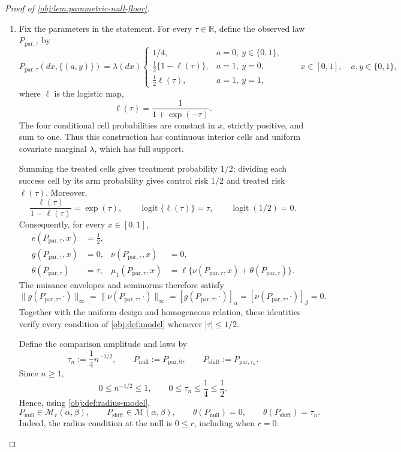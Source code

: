 \documentclass[11pt]{article}
\begin{document}
\begin{proof}[Proof of \cref{obj:lem:parametric-null-floor}]
\begin{enumerate}
\item Fix the parameters in the statement. For every \(\tau\in\mathbb R\), define the observed law \(P_{\mathrm{par},\tau}\) by
\[
P_{\mathrm{par},\tau}(dx,\{(a,y)\})
=
\lambda(dx)
\begin{cases}
1/4,&a=0,\ y\in\{0,1\},\\
\frac12\{1-\ell(\tau)\},&a=1,\ y=0,\\
\frac12\ell(\tau),&a=1,\ y=1,
\end{cases}
\qquad
x\in[0,1],\quad a,y\in\{0,1\},
\]
where \(\ell\) is the logistic map,
\[
\ell(\tau)=\frac{1}{1+\exp(-\tau)}.
\]
The four conditional cell probabilities are constant in \(x\), strictly positive, and sum to one. Thus this construction has continuous interior cells and uniform covariate marginal \(\lambda\), which has full support.

Summing the treated cells gives treatment probability \(1/2\); dividing each success cell by its arm probability gives control risk \(1/2\) and treated risk \(\ell(\tau)\). Moreover,
\[
\frac{\ell(\tau)}{1-\ell(\tau)}=\exp(\tau),
\qquad
\operatorname{logit}\{\ell(\tau)\}=\tau,
\qquad
\operatorname{logit}(1/2)=0.
\]
Consequently, for every \(x\in[0,1]\),
\[
\begin{aligned}
e(P_{\mathrm{par},\tau},x)&=\frac12,\\
g(P_{\mathrm{par},\tau},x)&=0,
&
\nu(P_{\mathrm{par},\tau},x)&=0,\\
\theta(P_{\mathrm{par},\tau})&=\tau,
&
\mu_1(P_{\mathrm{par},\tau},x)
&=\ell\{\nu(P_{\mathrm{par},\tau},x)+\theta(P_{\mathrm{par},\tau})\}.
\end{aligned}
\]
The nuisance envelopes and seminorms therefore satisfy
\[
\|g(P_{\mathrm{par},\tau},\cdot)\|_\infty
=
\|\nu(P_{\mathrm{par},\tau},\cdot)\|_\infty
=
[g(P_{\mathrm{par},\tau},\cdot)]_\alpha
=
[\nu(P_{\mathrm{par},\tau},\cdot)]_\beta
=0.
\]
Together with the uniform design and homogeneous relation, these identities verify every condition of \cref{obj:def:model} whenever \(|\tau|\le1/2\).

Define the comparison amplitude and laws by
\[
\tau_n:=\frac14 n^{-1/2},
\qquad
P_{\mathrm{null}}:=P_{\mathrm{par},0},
\qquad
P_{\mathrm{shift}}:=P_{\mathrm{par},\tau_n}.
\]
Since \(n\ge1\),
\[
0\le n^{-1/2}\le1,
\qquad
0\le\tau_n\le\frac14\le\frac12.
\]
Hence, using \cref{obj:def:radius-model},
\[
P_{\mathrm{null}}\in\mathcal M_r(\alpha,\beta),
\qquad
P_{\mathrm{shift}}\in\mathcal M(\alpha,\beta),
\qquad
\theta(P_{\mathrm{null}})=0,
\qquad
\theta(P_{\mathrm{shift}})=\tau_n.
\]
Indeed, the radius condition at the null is \(0\le r\), including when \(r=0\).


\end{enumerate}
\end{proof}
\end{document}
